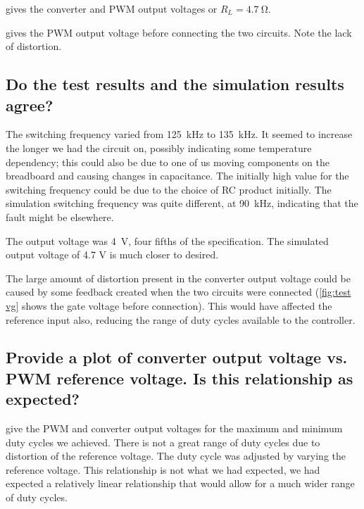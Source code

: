  gives the converter and PWM output voltages or $R_L = \SI{4.7}{\ohm}$.

 gives the PWM output voltage before connecting the two circuits. Note the lack of distortion.


\subsection{Do the test results and the simulation results agree?}
The switching frequency varied from \SI{125}{\kilo\hertz} to \SI{135}{\kilo\hertz}. It seemed to increase the longer we had the circuit on, possibly indicating some temperature dependency; this could also be due to one of us moving components on the breadboard and causing changes in capacitance.
The initially high value for the switching frequency could be due to the choice of RC product initially. The simulation switching frequency was quite different, at \SI{90}{\kilo\hertz}, indicating that the fault might be elsewhere.

The output voltage was \SI{4}{\volt}, four fifths of the specification. The simulated output voltage of 4.7 V is much closer to desired.

The large amount of distortion present in the converter output voltage could be caused by some feedback created when the two circuits were connected (\cref{fig:test vg} shows the gate voltage before connection). This would have affected the reference input also, reducing the range of duty cycles available to the controller.
\subsection{Provide a plot of converter output voltage vs. PWM reference voltage. Is this relationship as expected?}
 give the PWM and converter output voltages for the maximum and minimum duty cycles we achieved. There is not a great range of duty cycles due to distortion of the reference voltage. The duty cycle was adjusted by varying the reference voltage. This relationship is not what we had expected, we had expected a relatively linear relationship that would allow for a much wider range of duty cycles.
